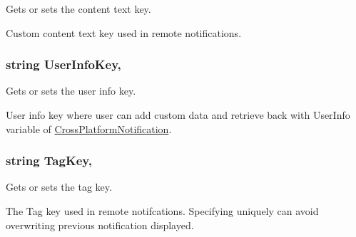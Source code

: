 Gets or sets the content text key. 

Custom content text key used in remote notifications.\hypertarget{class_voxel_busters_1_1_native_plugins_1_1_notification_service_settings_1_1_android_settings_ad699b1df7fea4928c313b2a6cf90a1a7}{}
\subsubsection[{User\+Info\+Key}]{\setlength{\rightskip}{0pt plus 5cm}string User\+Info\+Key\hspace{0.3cm}{\ttfamily [get]}, {\ttfamily [set]}}\label{class_voxel_busters_1_1_native_plugins_1_1_notification_service_settings_1_1_android_settings_ad699b1df7fea4928c313b2a6cf90a1a7}


Gets or sets the user info key. 

User info key where user can add custom data and retrieve back with User\+Info variable of \hyperlink{class_voxel_busters_1_1_native_plugins_1_1_cross_platform_notification}{Cross\+Platform\+Notification}.\hypertarget{class_voxel_busters_1_1_native_plugins_1_1_notification_service_settings_1_1_android_settings_a0051a810f2402a2ceaac14c1e58dc3a3}{}
\subsubsection[{Tag\+Key}]{\setlength{\rightskip}{0pt plus 5cm}string Tag\+Key\hspace{0.3cm}{\ttfamily [get]}, {\ttfamily [set]}}\label{class_voxel_busters_1_1_native_plugins_1_1_notification_service_settings_1_1_android_settings_a0051a810f2402a2ceaac14c1e58dc3a3}


Gets or sets the tag key. 

The Tag key used in remote notifcations. Specifying uniquely can avoid overwriting previous notification displayed.